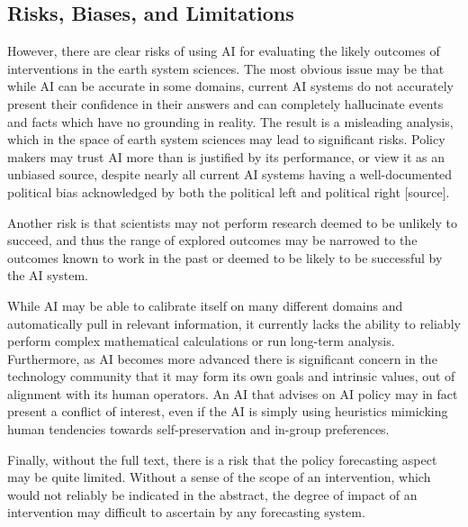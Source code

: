 \documentclass[12pt,a4paper]{article}
\begin{document}
\subsection{Risks, Biases, and Limitations}
However, there are clear risks of using AI for evaluating the likely outcomes of interventions in the earth system sciences. The most obvious issue may be that while AI can be accurate in some domains, current AI systems do not accurately present their confidence in their answers and can completely hallucinate events and facts which have no grounding in reality. The result is a misleading analysis, which in the space of earth system sciences may lead to significant risks. Policy makers may trust AI more than is justified by its performance, or view it as an unbiased source, despite nearly all current AI systems having a well-documented political bias acknowledged by both the political left and political right [source]. 

Another risk is that scientists may not perform research deemed to be unlikely to succeed, and thus the range of explored outcomes may be narrowed to the outcomes known to work in the past or deemed to be likely to be successful by the AI system. 

While AI may be able to calibrate itself on many different domains and automatically pull in relevant information, it currently lacks the ability to reliably perform complex mathematical calculations or run long-term analysis. Furthermore, as AI becomes more advanced there is significant concern in the technology community that it may form its own goals and intrinsic values, out of alignment with its human operators. An AI that advises on AI policy may in fact present a conflict of interest, even if the AI is simply using heuristics mimicking human tendencies towards self-preservation and in-group preferences. 

Finally, without the full text, there is a risk that the policy forecasting aspect may be quite limited. Without a sense of the scope of an intervention, which would not reliably be indicated in the abstract, the degree of impact of an intervention may difficult to ascertain by any forecasting system.
\end{document}

